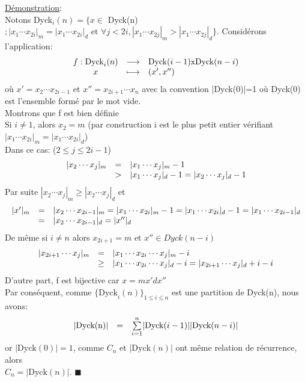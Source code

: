 		\underline{Démonstration}:\\
		Notons Dyck$_{i}(n)=\{ x \in $ Dyck(n)$; |x_{1}\cdots x_{2i}|_{m}=|x_{1}\cdots x_{2i}|_{d} \text{ et } \forall j<2i, |x_{1}\cdots x_{2j}|_{m}>|x_{1}\cdots x_{2j}|_{d}\}$. Considérons l'application:
		\[
		\begin{array}{c c l}
			f:\text{Dyck}_{i}(n)&\longrightarrow &\text{Dyck}(i-1)\text{x}\text{Dyck}(n-i)\\
			x&\longmapsto &(x',x'')
		\end{array}
		\] 
		où $x'=x_{2}\cdots x_{2i-1}$ et $x''=x_{2i+1}\cdots x_{n}$ avec la convention |Dyck(0)|=1 où Dyck(0) est l'ensemble formé par le mot vide.\\
		Montrons que  f est bien définie\\

		Si $i\neq1$, alors $x_{2}=m$ (par construction i est le plus petit entier vérifiant \\
		$|x_{1}\cdots x_{2i}|_{m}=|x_{1}\cdots x_{2i}|_{d}$)\\ Dans ce cas: ($2\leq j \leq 2i-1$)
		\[
		\begin{array}{c c l}
			|x_{2}\cdots x_{j}|_{m}&=&|x_{1}\cdots x_{j}|_{m}-1\\
			&>&|x_{1}\cdots x_{j}|_{d}-1=|x_{2}\cdots x_{j}|_{d}-1
		\end{array}
		\]
		Par suite $ |x_{2}\cdots x_{j}|_{m}\geq |x_{2}\cdots x_{j}|_{d}$
		et 
		\[
		\begin{array}{c c l}
			|x'|_{m}&=&|x_{2}\cdots x_{2i-1}|_{m}=|x_{1}\cdots x_{2i}|_{m}-1=|x_{1}\cdots x_{2i}|_{d}-1=|x_{1}\cdots x_{2i-1}|_{d}\\
			&=&|x_{2}\cdots x_{2i-1}|_{d}=|x''|_{d}
		\end{array}
		\]
		De même si $i\neq n$ alors $x_{2i+1}=m$ et $x''\in Dyck(n-i)$
		\[
		\begin{array}{c c l}
		|x_{2i+1}\cdots x_{j}|_{m}&=&|x_{1}\cdots x_{2i}\cdots x_{j}|_{m}-i\\
		&\geq&|x_{1}\cdots x_{2i}\cdots x_{j}|_{d}-i=|x_{2i+1}\cdots x_{j}|_{d}+i-i

		\end{array}
		\]
		D'autre part, f est bijective car $x=mx'dx''$\\
		Par conséquent, comme $\{\text{Dyck}_{i}(n)\}_{1\leq i\leq n}$ est une partition de Dyck(n), nous avons:
		\[
		\begin{array}{c c l}
		|\text{Dyck(n)}|&=&\underset{i=1}{\overset{n}{\sum}}|\text{Dyck}(i-1)||\text{Dyck}(n-i)|
		\end{array}
		\]
		or $|\text{Dyck}(0)|=1$, comme $C_{n}$ et $|\text{Dyck}(n)|$ ont même relation de récurrence, alors\\  $C_{n }=|\text{Dyck}(n)|$.  $\blacksquare$ \newpage

